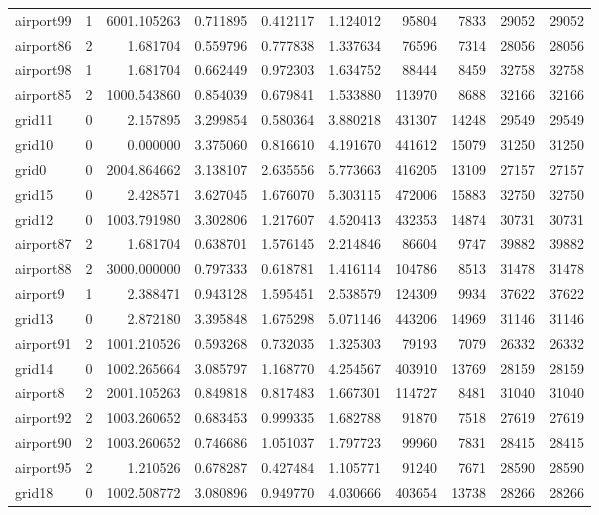 \documentclass[../../../thesis.tex]{subfiles}
\begin{document}
\begin{longtable}{|l|r|r|r|r|r|r|r|r|r|}
airport99 & 1 & 6001.105263 & 0.711895 & 0.412117 & 1.124012 & 95804 & 7833 & 29052 & 29052 \\
airport86 & 2 & 1.681704 & 0.559796 & 0.777838 & 1.337634 & 76596 & 7314 & 28056 & 28056 \\
airport98 & 1 & 1.681704 & 0.662449 & 0.972303 & 1.634752 & 88444 & 8459 & 32758 & 32758 \\
airport85 & 2 & 1000.543860 & 0.854039 & 0.679841 & 1.533880 & 113970 & 8688 & 32166 & 32166 \\
grid11 & 0 & 2.157895 & 3.299854 & 0.580364 & 3.880218 & 431307 & 14248 & 29549 & 29549 \\
grid10 & 0 & 0.000000 & 3.375060 & 0.816610 & 4.191670 & 441612 & 15079 & 31250 & 31250 \\
grid0 & 0 & 2004.864662 & 3.138107 & 2.635556 & 5.773663 & 416205 & 13109 & 27157 & 27157 \\
grid15 & 0 & 2.428571 & 3.627045 & 1.676070 & 5.303115 & 472006 & 15883 & 32750 & 32750 \\
grid12 & 0 & 1003.791980 & 3.302806 & 1.217607 & 4.520413 & 432353 & 14874 & 30731 & 30731 \\
airport87 & 2 & 1.681704 & 0.638701 & 1.576145 & 2.214846 & 86604 & 9747 & 39882 & 39882 \\
airport88 & 2 & 3000.000000 & 0.797333 & 0.618781 & 1.416114 & 104786 & 8513 & 31478 & 31478 \\
airport9 & 1 & 2.388471 & 0.943128 & 1.595451 & 2.538579 & 124309 & 9934 & 37622 & 37622 \\
grid13 & 0 & 2.872180 & 3.395848 & 1.675298 & 5.071146 & 443206 & 14969 & 31146 & 31146 \\
airport91 & 2 & 1001.210526 & 0.593268 & 0.732035 & 1.325303 & 79193 & 7079 & 26332 & 26332 \\
grid14 & 0 & 1002.265664 & 3.085797 & 1.168770 & 4.254567 & 403910 & 13769 & 28159 & 28159 \\
airport8 & 2 & 2001.105263 & 0.849818 & 0.817483 & 1.667301 & 114727 & 8481 & 31040 & 31040 \\
airport92 & 2 & 1003.260652 & 0.683453 & 0.999335 & 1.682788 & 91870 & 7518 & 27619 & 27619 \\
airport90 & 2 & 1003.260652 & 0.746686 & 1.051037 & 1.797723 & 99960 & 7831 & 28415 & 28415 \\
airport95 & 2 & 1.210526 & 0.678287 & 0.427484 & 1.105771 & 91240 & 7671 & 28590 & 28590 \\
grid18 & 0 & 1002.508772 & 3.080896 & 0.949770 & 4.030666 & 403654 & 13738 & 28266 & 28266 \\

\end{longtable}
\end{document}
